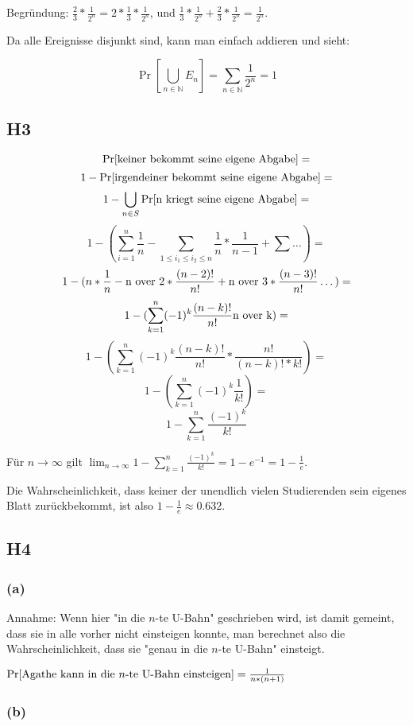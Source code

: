 \documentclass{article}
\begin{document}
Begründung: $\frac{2}{3}*\frac{1}{2^n}=2*\frac{1}{3}*\frac{1}{2^n}$,
und $\frac{1}{3}*\frac{1}{2^n}+\frac{2}{3}*\frac{1}{2^n}=\frac{1}{2^n}$.

Da alle Ereignisse disjunkt sind, kann man einfach addieren und sieht:

$$ \Pr[\bigcup_{n \in \mathbb{N}} E_n] = \sum_{n \in \mathbb{N}} \frac{1}{2^n}=1 $$

\subsection*{H3}

$$ \Pr[\hbox{keiner bekommt seine eigene Abgabe}]= $$
$$ 1-\Pr[\hbox{irgendeiner bekommt seine eigene Abgabe}]= $$
$$ 1-\bigcup_{n \in S} \Pr[\hbox{n kriegt seine eigene Abgabe}]= $$
$$ 1-(\sum_{i=1}^n \frac{1}{n}-\sum_{1 \le i_1 \le i_2 \le n} \frac{1}{n} * \frac{1}{n-1} + \sum \dots)= $$
$$ 1-(n*\frac{1}{n}-\hbox{n over 2}*\frac{(n-2)!}{n!}+\hbox{n over 3}*\frac{(n-3)!}{n!} \dots)= $$
$$ 1-(\sum_{k=1}^{n} (-1)^k \frac{(n-k)!}{n!} \hbox{n over k})= $$
$$ 1-(\sum_{k=1}^{n} (-1)^k \frac{(n-k)!}{n!} * \frac{n!}{(n-k)!*k!})= $$
$$ 1-(\sum_{k=1}^{n} (-1)^k \frac{1}{k!})= $$
$$ 1-\sum_{k=1}^{n} \frac{(-1)^k}{k!} $$

Für $n \rightarrow \infty$ gilt $\lim_{n \rightarrow \infty}
1-\sum_{k=1}^{n} \frac{(-1)^k}{k!}=1-e^{-1}=1-\frac{1}{e} $.

Die Wahrscheinlichkeit, dass keiner der unendlich vielen Studierenden
sein eigenes Blatt zurückbekommt, ist also $1-\frac{1}{e}\approx0.632$.

\subsection*{H4}

\subsubsection*{(a)}

Annahme: Wenn hier "in die $n$-te U-Bahn" geschrieben wird, ist damit
gemeint, dass sie in alle vorher nicht einsteigen konnte, man berechnet
also die Wahrscheinlichkeit, dass sie "genau in die $n$-te U-Bahn"
einsteigt.


$ \Pr[\hbox{Agathe kann in die $n$-te U-Bahn einsteigen}]=\frac{1}{n*(n+1)} $

\subsubsection*{(b)}
\end{document}
